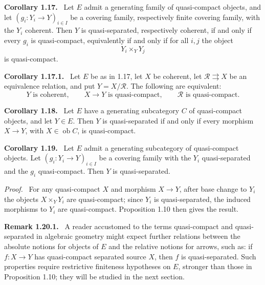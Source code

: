 \documentclass[11pt]{article}
\newcommand{\Rr}{\mathcal{R}}
\newcommand{\ob}{\operatorname{ob}}
\newcommand{\fprod}[3]{{#1}\times_{#3}{#2}}
\newenvironment{statement}[1]{\par\medskip\noindent\textbf{#1.}\ }{\par\medskip}
\newenvironment{remarktext}[1]{\par\medskip\noindent\textbf{#1.}\ }{\par\medskip}
\newenvironment{prooftext}{\par\noindent\emph{Proof.}\ }{\par\medskip}
\begin{document}
\begin{statement}{Corollary 1.17}
Let \(E\) admit a generating family of quasi-compact objects, and let \((g_i:Y_i\to Y)_{i\in I}\) be a covering family, respectively finite covering family, with the \(Y_i\) coherent. Then \(Y\) is quasi-separated, respectively coherent, if and only if every \(g_i\) is quasi-compact, equivalently if and only if for all \(i,j\) the object
\[
\fprod{Y_i}{Y_j}{Y}
\]
is quasi-compact.
\end{statement}

\begin{statement}{Corollary 1.17.1}
Let \(E\) be as in 1.17, let \(X\) be coherent, let \(\Rr\rightrightarrows X\) be an equivalence relation, and put \(Y=X/\Rr\). The following are equivalent:
\[
Y\text{ is coherent},\qquad X\to Y\text{ is quasi-compact},\qquad \Rr\text{ is quasi-compact}.
\]
\end{statement}

\begin{statement}{Corollary 1.18}
Let \(E\) have a generating subcategory \(C\) of quasi-compact objects, and let \(Y\in E\). Then \(Y\) is quasi-separated if and only if every morphism \(X\to Y\), with \(X\in\ob C\), is quasi-compact.
\end{statement}

\begin{statement}{Corollary 1.19}
Let \(E\) admit a generating subcategory of quasi-compact objects. Let \((g_i:Y_i\to Y)_{i\in I}\) be a covering family with the \(Y_i\) quasi-separated and the \(g_i\) quasi-compact. Then \(Y\) is quasi-separated.
\end{statement}

\begin{prooftext}
For any quasi-compact \(X\) and morphism \(X\to Y\), after base change to \(Y_i\) the objects \(X\times_YY_i\) are quasi-compact; since \(Y_i\) is quasi-separated, the induced morphisms to \(Y_i\) are quasi-compact. Proposition 1.10 then gives the result.
\end{prooftext}

\begin{remarktext}{Remark 1.20.1}
A reader accustomed to the terms quasi-compact and quasi-separated in algebraic geometry might expect further relations between the absolute notions for objects of \(E\) and the relative notions for arrows, such as: if \(f:X\to Y\) has quasi-compact separated source \(X\), then \(f\) is quasi-separated. Such properties require restrictive finiteness hypotheses on \(E\), stronger than those in Proposition 1.10; they will be studied in the next section.
\end{remarktext}
\end{document}
